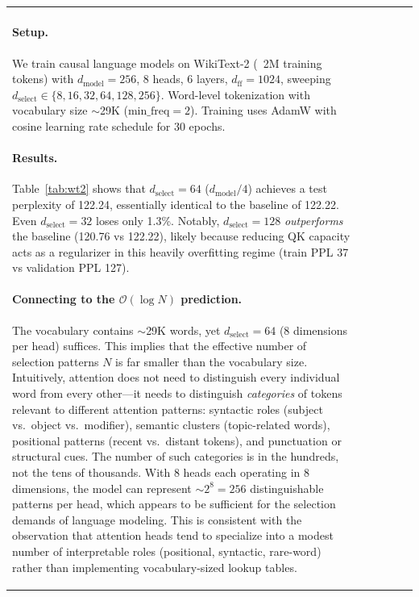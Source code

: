 \documentclass[11pt]{article}
\newcommand{\dmodel}{d_{\text{model}}}
\newcommand{\dselect}{d_{\text{select}}}
\newcommand{\BigO}{\mathcal{O}}
\begin{document}
\begin{table}[h]
\begin{tabular}{lccccc}
\paragraph{Setup.}
We train causal language models on WikiText-2 \citep{merity2017pointer} (~2M training tokens) with $\dmodel = 256$, 8 heads, 6 layers, $d_{\text{ff}} = 1024$, sweeping $\dselect \in \{8, 16, 32, 64, 128, 256\}$. Word-level tokenization with vocabulary size $\sim$29K ($\text{min\_freq} = 2$). Training uses AdamW with cosine learning rate schedule for 30 epochs.

\paragraph{Results.}
Table~\ref{tab:wt2} shows that $\dselect = 64$ ($\dmodel/4$) achieves a test perplexity of 122.24, essentially identical to the baseline of 122.22. Even $\dselect = 32$ loses only 1.3\%. Notably, $\dselect = 128$ \emph{outperforms} the baseline (120.76 vs 122.22), likely because reducing QK capacity acts as a regularizer in this heavily overfitting regime (train PPL 37 vs validation PPL 127).

\paragraph{Connecting to the $\BigO(\log N)$ prediction.}
The vocabulary contains $\sim$29K words, yet $\dselect = 64$ (8 dimensions per head) suffices. This implies that the effective number of selection patterns $N$ is far smaller than the vocabulary size. Intuitively, attention does not need to distinguish every individual word from every other---it needs to distinguish \emph{categories} of tokens relevant to different attention patterns: syntactic roles (subject vs.\ object vs.\ modifier), semantic clusters (topic-related words), positional patterns (recent vs.\ distant tokens), and punctuation or structural cues. The number of such categories is in the hundreds, not the tens of thousands. With 8 heads each operating in 8 dimensions, the model can represent $\sim\!2^8 = 256$ distinguishable patterns per head, which appears to be sufficient for the selection demands of language modeling. This is consistent with the observation that attention heads tend to specialize into a modest number of interpretable roles (positional, syntactic, rare-word) rather than implementing vocabulary-sized lookup tables.


\end{tabular}
\end{table}
\end{document}
